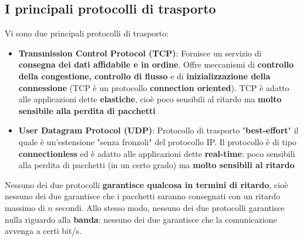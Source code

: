 \documentclass[12pt]{article}
\begin{document}
\subsection{I principali protocolli di trasporto}
Vi sono due principali protocolli di trasporto:
\begin{itemize}
    \item \textbf{Transmission Control Protocol (TCP)}: Fornisce un servizio di \textbf{consegna dei dati affidabile e in ordine}.
    Offre meccanismi di \textbf{controllo della congestione, controllo di flusso} e di \textbf{inizializzazione della connessione} (TCP è un protocollo \textbf{connection oriented}).
    TCP è adatto alle applicazioni dette \textbf{elastiche}, cioè poco sensibili al ritardo ma \textbf{molto sensibile alla perdita di pacchetti}
    \item \textbf{User Datagram Protocol (UDP)}: Protocollo di trasporto "\textbf{best-effort}" il quale è un'estensione "senza fronzoli" del protocollo IP. 
    Il protocollo è di tipo \textbf{connectionless} ed è adatto alle applicazioni dette \textbf{real-time}: poco sensibili
    alla perdita di pacchetti (in un certo grado) ma \textbf{molto sensibili al ritardo}
\end{itemize}
Nessuno dei due protocolli \textbf{garantisce qualcosa in termini di ritardo}, cioè nessuno dei due garantisce che i pacchetti saranno
consegnati con un ritardo massimo di $n$ secondi. Allo stesso modo, nessuno dei due protocolli garantisce nulla riguardo alla \textbf{banda}: nessuno dei due
garantisce che la comunicazione avvenga a certi bit/s.
\end{document}

